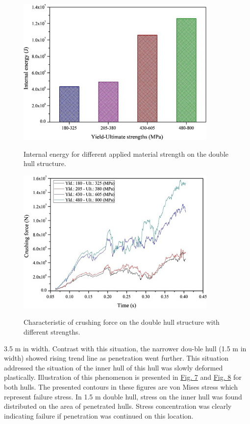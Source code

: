 \documentclass[../Final.tex]{subfiles}
\begin{document}
\begin{figure}[ht]
    \centering
    \includegraphics[width=0.95\columnwidth]{fig9.jpg}
    \label{fig9}
    \caption{Internal energy for different applied material strength on the double hull structure.}
\end{figure}

\begin{figure}[ht]
    \centering
    \includegraphics[width=0.95\columnwidth]{fig10.jpg}
    \label{fig10}
    \caption{Characteristic of crushing force on the double hull structure with different strengths.}
\end{figure}

3.5 m in width. Contrast with this situation, the narrower dou-ble hull (1.5 m in width) showed rising trend line as penetration went further. 
This situation addressed the situation of the inner hull of this hull was slowly deformed plastically. Illustration of this phenomenon is presented in \hyperref[fig7]{Fig. 7} and \hyperref[fig8]{Fig. 8} for both hulls. 
The presented contours in these figures are von Mises stress which represent failure stress. In 1.5 m double hull, stress on the inner hull was found distributed on the area of penetrated hulls. 
Stress concentration was clearly indicating failure if pen­etration was continued on this location. 
\end{document}

